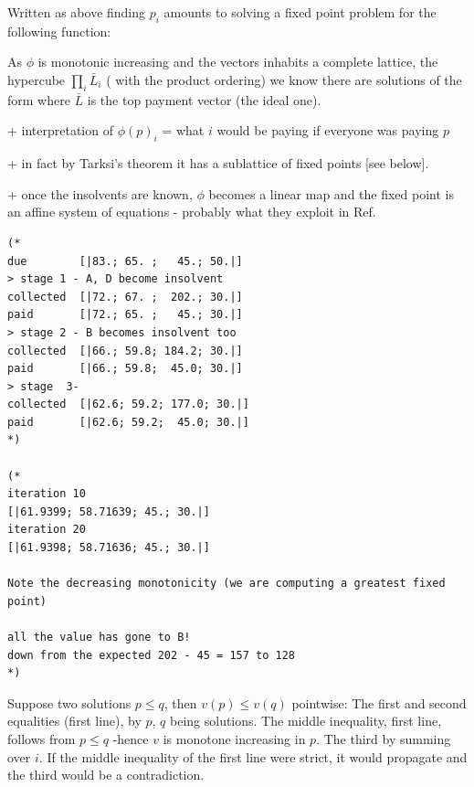 \documentclass[oneside]{article}
\begin{document}
Written as above finding $p_i$ amounts to solving a fixed point problem
for the following function: 

As $\phi$ is monotonic increasing and the vectors inhabits a complete lattice,
the hypercube $\prod_i \bar L_i$ ( with the product ordering) we know there are solutions 
of the form
where $\bar L$ is the top payment vector (the ideal one).

+ interpretation of $\phi(p)_i$ = what $i$ would be paying if
everyone was paying $p$

+ in fact by Tarksi's theorem it has a sublattice of fixed points [see below]. 

+ once the insolvents are known, $\phi$ becomes a linear map
and the fixed point is an affine system of equations - probably 
what they exploit in Ref.~\cite{rogers2013failure}

\newpage
\begin{verbatim}
(*
due        [|83.; 65. ;   45.; 50.|]
> stage 1 - A, D become insolvent  
collected  [|72.; 67. ;  202.; 30.|]
paid       [|72.; 65. ;   45.; 30.|]
> stage 2 - B becomes insolvent too
collected  [|66.; 59.8; 184.2; 30.|]
paid       [|66.; 59.8;  45.0; 30.|]
> stage  3- 
collected  [|62.6; 59.2; 177.0; 30.|]
paid       [|62.6; 59.2;  45.0; 30.|]
*)

(* 
iteration 10
[|61.9399; 58.71639; 45.; 30.|]
iteration 20
[|61.9398; 58.71636; 45.; 30.|]

Note the decreasing monotonicity (we are computing a greatest fixed point)

all the value has gone to B!
down from the expected 202 - 45 = 157 to 128
*)

\end{verbatim}

\newpage


Suppose two solutions $p\leq q$, then $v(p)\leq v(q)$ pointwise:
The first and second equalities (first line), by $p$, $q$ being solutions. 
The middle inequality, first line, follows from $p\leq q$ -hence $v$ is monotone increasing in $p$.
The third by summing over $i$.
If the middle inequality of the first line were strict, it would propagate 
and the third would be a contradiction. 
\end{document}
